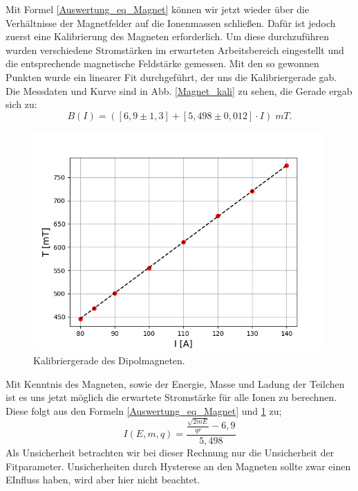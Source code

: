 Mit Formel \ref{Auswertung_eq_Magnet} können wir jetzt wieder über die Verhältnisse der Magnetfelder auf die Ionenmassen schließen.
Dafür ist jedoch zuerst eine Kalibrierung des Magneten erforderlich. 
Um diese durchzuführen wurden verschiedene Stromstärken im erwarteten Arbeitsbereich eingestellt und die entsprechende magnetische Feldstärke gemessen.
Mit den so gewonnen Punkten wurde ein linearer Fit durchgeführt, der uns die Kalibriergerade gab.
Die Messdaten und Kurve sind in Abb. \ref{Magnet_kali} zu sehen, die Gerade ergab sich zu:
\begin{equation}
B(I) = ( [6,9 \pm 1,3] + [5,498 \pm 0,012] \cdot I ) \; mT.
\label{kali}
\end{equation}

\begin{figure}[ht]
  \centering
  \includegraphics[width=0.7\linewidth]{Pictures/magnet.png}
  \caption{Kalibriergerade des Dipolmagneten.}
  \label{kali}
\end{figure}

Mit Kenntnis des Magneten, sowie der Energie, Masse und Ladung der Teilchen ist es uns jetzt möglich die erwartete Stromstärke für alle Ionen zu berechnen.
Diese folgt aus den Formeln \ref{Auswertung_eq_Magnet} und \ref{kali} zu;
\begin{equation}
I(E, m, q) = \frac{\frac{{\sqrt{2mE}}}{qr}-6,9}{5,498}
\label{HE_ion}
\end{equation}
Als Unsicherheit betrachten wir bei dieser Rechnung nur die Unsicherheit der Fitparameter.
Unsicherheiten durch Hysterese an den Magneten sollte zwar einen EInfluss haben, wird aber hier nicht beachtet.

